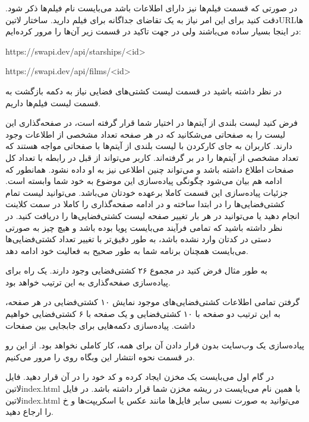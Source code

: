 \documentclass[../main.tex]{subfiles}
\begin{document}
در صورتی که قسمت فیلم‌ها نیز دارای اطلاعات باشد می‌بایست نام فیلم‌ها ذکر شود.
دقت کنید برای این امر نیاز به یک تقاضای جداگانه برای فیلم دارید. ساختار ‌لاتین{URL}ها در اینجا بسیار ساده می‌باشند ولی در جهت تاکید در قسمت زیر آن‌ها را مرور کرده‌ایم:

\begin{itemize}\begin{latinitems}
  \item https://swapi.dev/api/starships/<id>
  \item https://swapi.dev/api/films/<id>
\end{latinitems}\end{itemize}

در نظر داشته باشید در قسمت لیست کشتی‌های فضایی نیاز به دکمه بازگشت به قسمت لیست فیلم‌ها داریم.


فرض کنید لیست بلندی از آیتم‌ها در اختیار شما قرار گرفته است، در صفحه‌گذاری این لیست را به صفحاتی می‌شکانید که در هر صفحه تعداد مشخصی از اطلاعات وجود دارند. کاربران به جای کارکردن با لیست بلندی از آیتم‌ها با صفحاتی مواجه هستند که تعداد مشخصی از آیتم‌ها را در بر گرفته‌اند. کاربر می‌تواند از قبل در رابطه با تعداد کل صفحات اطلاع داشته باشد و می‌تواند چنین اطلاعی نیز به او داده نشود. همانطور که ادامه هم بیان می‌شود چگونگی پیاده‌سازی این موضوع به خود شما وابسته است.
جزئیات پیاده‌سازی این قسمت کاملا برعهده خودتان می‌باشد.
می‌توانید لیست تمام کشتی‌فضایی‌ها را در ابتدا ساخته و در ادامه صفحه‌گذاری را کاملا در سمت کلاینت انجام دهید یا می‌توانید در هر بار تغییر صفحه لیست کشتی‌فضایی‌ها را دریافت کنید.
در نظر داشته باشید که تمامی فرآیند می‌بایست پویا بوده باشد و هیچ چیز به صورتی دستی در کدتان وارد نشده باشد، به طور دقیق‌تر با تغییر تعداد کشتی‌فضایی‌ها می‌بایست همچنان برنامه شما به طور صحیح به فعالیت خود ادامه دهد.

به طور مثال فرض کنید در مجموع ۲۶ کشتی‌فضایی وجود دارند. یک راه برای پیاده‌سازی صفحه‌گذاری به این ترتیب خواهد بود.

 گرفتن تمامی اطلاعات کشتی‌فضایی‌های موجود
 نمایش ۱۰ کشتی‌فضایی در هر صفحه، به این ترتیب دو صفحه با ۱۰ کشتی‌فضایی و یک صفحه با ۶ کشتی‌فضایی خواهیم داشت.
 پیاده‌سازی دکمه‌هایی برای جابجایی بین صفحات

پیاده‌سازی یک وب‌سایت بدون قرار دادن آن برای همه، کار کاملی نخواهد بود. از این رو در قسمت نحوه انتشار این وبگاه روی  را مرور می‌کنیم.

در گام اول می‌بایست یک مخزن ایجاد کرده و کد خود را در آن قرار دهید. فایل ‌لاتین{index.html} با همین نام می‌بایست در ریشه مخزن شما قرار داشته باشد.
در فایل ‌لاتین{index.html} می‌توانید به صورت نسبی سایر فایل‌ها مانند عکس یا اسکریپت‌ها و ‌خ را ارجاع دهید.
\end{document}
